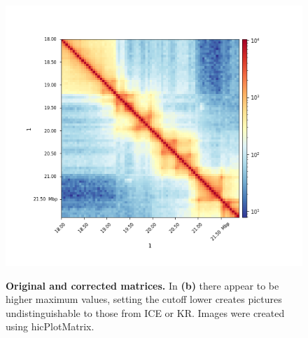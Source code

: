 \begin{figure}[!htbp]
\begin{centering}
{            \includegraphics[scale=0.4]{figures/results/c_ice_50kb}}
        \caption[Plotting corrected matrices]
        {\textbf{Original and corrected matrices.} In \textbf{(b)} there appear to be
        higher maximum values, setting the cutoff lower creates pictures
        undistinguishable to those from ICE or KR.
        Images were created using hicPlotMatrix.
        }
        \label{fig:plotted}
    \end{centering}
\end{figure}
